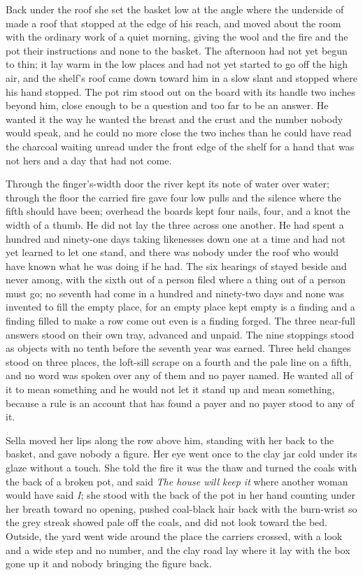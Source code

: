 \scenebreak

Back under the roof she set the basket low at the angle where the underside of  made a roof that stopped at the edge of his reach, and moved about the room with the ordinary work of a quiet morning, giving the wool and the fire and the pot their instructions and none to the basket. The afternoon had not yet begun to thin; it lay warm in the low places and had not yet started to go off the high air, and the shelf's roof came down toward him in a slow slant and stopped where his hand stopped. The pot rim stood out on the board with its handle two inches beyond him, close enough to be a question and too far to be an answer. He wanted it the way he wanted the breast and the crust and the number nobody would speak, and he could no more close the two inches than he could have read the charcoal waiting unread under the front edge of the shelf for a hand that was not hers and a day that had not come.

Through the finger's-width door the river kept its note of water over water; through the floor the carried fire gave four low pulls and the silence where the fifth should have been; overhead the boards kept four nails, four, and a knot the width of a thumb. He did not lay the three across one another. He had spent a hundred and ninety-one days taking likenesses down one at a time and had not yet learned to let one stand, and there was nobody under the roof who would have known what he was doing if he had. The six hearings of  stayed beside and never among, with the sixth out of a person filed where a thing out of a person must go; no seventh had come in a hundred and ninety-two days and none was invented to fill the empty place, for an empty place kept empty is a finding and a finding filled to make a row come out even is a finding forged. The three near-full answers stood on their own tray, advanced and unpaid. The nine stoppings stood as objects with no tenth before the seventh year was earned. Three held changes stood on three places, the loft-sill scrape on a fourth and the pale line on a fifth, and no word was spoken over any of them and no payer named. He wanted all of it to mean something and he would not let it stand up and mean something, because a rule is an account that has found a payer and no payer stood to any of it.

Sella moved her lips along the row above him, standing with her back to the basket, and gave nobody a figure. Her eye went once to the clay jar cold under its glaze without a touch. She told the fire it was the thaw and turned the coals with the back of a broken pot, and said \emph{The house will keep it} where another woman would have said \emph{I}; she stood with the back of the pot in her hand counting under her breath toward no opening, pushed coal-black hair back with the burn-wrist so the grey streak showed pale off the coals, and did not look toward the bed. Outside, the yard went wide around the place the carriers crossed, with a look and a wide step and no number, and the clay road lay where it lay with the box gone up it and nobody bringing the figure back.

